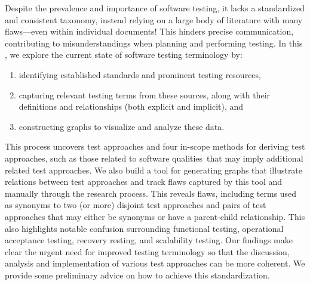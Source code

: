 \label{abstract}%
Despite the prevalence and importance of software testing, it lacks
a standardized and consistent taxonomy, instead relying on a large body of
literature with many flaws---even within individual documents! This hinders
precise communication, contributing to misunderstandings when planning and
performing testing. In this \docType{}, we %
explore the current state of software testing terminology by:
\begin{enumerate}
    \item identifying established standards and prominent testing resources,
    \item capturing relevant testing terms from these sources, along with their
          definitions and relationships (both explicit and implicit), and
    \item constructing graphs to visualize and analyze these data.
\end{enumerate}
This process uncovers \approachCount{} test approaches and
\ifnotpaper four in-scope methods for deriving test approaches, such as those
    related to \fi \qualityCount{} software qualities\ifnotpaper\else\ that may
    imply additional related test approaches\fi. We also build
a tool for generating graphs that illustrate relations between test
approaches and track flaws captured by this tool and manually through
the research process. This reveals \flawCount{} flaws, including
\multiSynCount{} terms used as synonyms to two (or more) disjoint test approaches
and \parSynCount{} pairs of test approaches that may either be synonyms or have
a parent-child relationship. This also highlights notable confusion surrounding
functional testing, \ifnotpaper operational acceptance testing, \fi recovery
resting, and scalability testing. Our
findings make clear the urgent need for improved testing terminology so that
the discussion, analysis and implementation of various test approaches can be
more coherent. We provide some preliminary advice on how to achieve this
standardization.